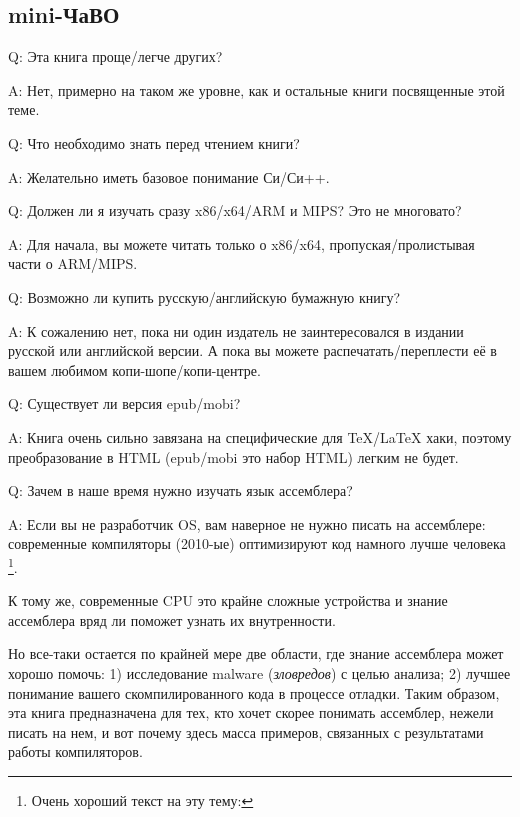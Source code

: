 \subsection*{mini-ЧаВО}

\par Q: Эта книга проще/легче других?
\par A: Нет, примерно на таком же уровне, как и остальные книги посвященные этой теме.

\par Q: Что необходимо знать перед чтением книги?
\par A: Желательно иметь базовое понимание Си/Си++.

\par Q: Должен ли я изучать сразу x86/x64/ARM и MIPS? Это не многовато?
\par A: Для начала, вы можете читать только о x86/x64, пропуская/пролистывая части о ARM/MIPS.

\par Q: Возможно ли купить русскую/английскую бумажную книгу?
\par A: К сожалению нет, пока ни один издатель не заинтересовался в издании русской или английской версии.
А пока вы можете распечатать/переплести её в вашем любимом копи-шопе/копи-центре.

\par Q: Существует ли версия epub/mobi?
\par A: Книга очень сильно завязана на специфические для TeX/LaTeX хаки, поэтому преобразование в HTML (epub/mobi это набор HTML)
легким не будет.

\par Q: Зачем в наше время нужно изучать язык ассемблера?
\par A: Если вы не разработчик \ac{OS}, вам наверное не нужно писать на ассемблере: современные компиляторы (2010-ые) оптимизируют код намного лучше человека
\footnote{Очень хороший текст на эту тему: \InSqBrackets{\AgnerFog}}.

К тому же, современные \ac{CPU} это крайне сложные устройства и знание ассемблера вряд ли
поможет узнать их внутренности.

Но все-таки остается по крайней мере две области, где знание ассемблера может хорошо помочь:
1) исследование malware (\emph{зловредов}) с целью анализа; 2) лучшее понимание
вашего скомпилированного кода в процессе отладки.
Таким образом, эта книга предназначена для тех, кто хочет скорее понимать ассемблер,
нежели писать на нем, и вот почему здесь масса примеров, связанных с результатами
работы компиляторов.

